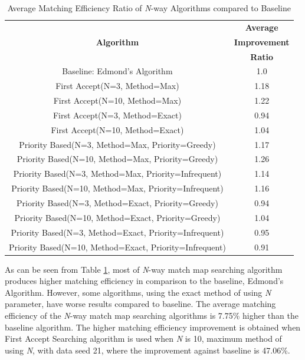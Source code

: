 \documentclass[conference]{IEEEtran}
\begin{document}
\begin{table}[htbp]
    \caption{Average Matching Efficiency Ratio of \textit{N}-way Algorithms compared to Baseline}
    \begin{center}
    \def\arraystretch{1.5}
    \begin{tabular}{|c|c|}
    \hline
    \cellcolor{tableheader}&\cellcolor{tableheader}\textbf{Average} \\
    \cellcolor{tableheader}\textbf{Algorithm}&\cellcolor{tableheader}\textbf{Improvement}\\
    \cellcolor{tableheader}&\cellcolor{tableheader}\textbf{Ratio}\\
    \hline
    Baseline: Edmond's Algorithm&1.0 \\
    \hline
    First Accept(N=3, Method=Max)&\cellcolor{moreratio}1.18 \\
    \hline
    First Accept(N=10, Method=Max)&\cellcolor{moreratio}1.22 \\
    \hline
    First Accept(N=3, Method=Exact)&\cellcolor{lessratio}0.94 \\
    \hline
    First Accept(N=10, Method=Exact)&\cellcolor{moreratio}1.04 \\
    \hline
    Priority Based(N=3, Method=Max, Priority=Greedy)&\cellcolor{moreratio}1.17 \\
    \hline
    Priority Based(N=10, Method=Max, Priority=Greedy)&\cellcolor{moreratio}1.26 \\
    \hline
    Priority Based(N=3, Method=Max, Priority=Infrequent)&\cellcolor{moreratio}1.14 \\
    \hline
    Priority Based(N=10, Method=Max, Priority=Infrequent)&\cellcolor{moreratio}1.16 \\
    \hline
    Priority Based(N=3, Method=Exact, Priority=Greedy)&\cellcolor{lessratio}0.94 \\
    \hline
    Priority Based(N=10, Method=Exact, Priority=Greedy)&\cellcolor{moreratio}1.04 \\
    \hline
    Priority Based(N=3, Method=Exact, Priority=Infrequent)&\cellcolor{lessratio}0.95 \\
    \hline
    Priority Based(N=10, Method=Exact, Priority=Infrequent)&\cellcolor{lessratio}0.91 \\
    \hline
    \end{tabular}
    \label{tab2}
    \end{center}
\end{table}

As can be seen from Table \ref{tab2}, most of \textit{N}-way match map searching algorithm produces higher matching efficiency in
comparison to the baseline, Edmond's Algorithm. However, some algorithms, using the exact method of using \textit{N} parameter,
have worse results compared to baseline. The average matching efficiency of the \textit{N}-way match map searching
algorithms is 7.75\% higher than the baseline algorithm. The higher matching efficiency improvement is obtained when First Accept
Searching algorithm is used when \textit{N} is 10, maximum method of using \textit{N}, with data seed 21, where the improvement
against baseline is 47.06\%.
\end{document}
